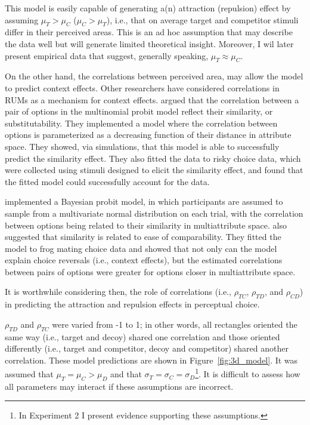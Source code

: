 This model is easily capable of generating a(n) attraction (repulsion) effect by assuming $\mu_{T}>\mu_{C}$ ($\mu_{C}>\mu_{T}$), i.e., that on average target and competitor stimuli differ in their perceived areas. This is an ad hoc assumption that may describe the data well but will generate limited theoretical insight. Moreover, I wil later present empirical data that suggest, generally speaking, $\mu_{T}\approx\mu_{C}$. 

On the other hand, the correlations between perceived area, may allow the model to predict context effects. Other researchers have considered correlations in RUMs as a mechanism for context effects. \textcite{kamakura1984predicting} argued that the correlation between a pair of options in the multinomial probit model reflect their similarity, or substitutability. They implemented a model where the correlation between options is parameterized as a decreasing function of their distance in attribute space. They showed, via simulations, that this model is able to successfully predict the similarity effect. They also fitted the data to risky choice data, which were collected using stimuli designed to elicit the similarity effect, and found that the fitted model could successfully account for the data. 

\textcite{natenzon2019random} implemented a Bayesian probit model, in which participants are assumed to sample from a multivariate normal distribution on each trial, with the correlation between options being related to their similarity in multiattribute space. \textcite{natenzon2019random} also suggested that similarity is related to ease of comparability. They fitted the model to frog mating choice data and showed that not only can the model explain choice reversals (i.e., context effects), but the estimated correlations between pairs of options were greater for options closer in multiattribute space. 

It is worthwhile considering then, the role of correlations (i.e., $\rho_{TC}$, $\rho_{TD}$, and $\rho_{CD}$) in predicting the attraction and repulsion effects in perceptual choice. 

$\rho_{TD}$ and $\rho_{TC}$ were varied from -1 to 1; in other words, all rectangles oriented the same way (i.e., target and decoy) shared one correlation and those oriented differently (i.e., target and competitor, decoy and competitor) shared another correlation. These model predictions are shown in Figure~\ref{fig:3d_model}. It was assumed that $\mu_{T}=\mu_{C}>\mu_{D}$ and that $\sigma_{T}=\sigma_{C}=\sigma_{D}$\footnote{In Experiment 2 I present evidence supporting these assumptions.}. It is difficult to assess how all parameters may interact if these assumptions are incorrect. 

